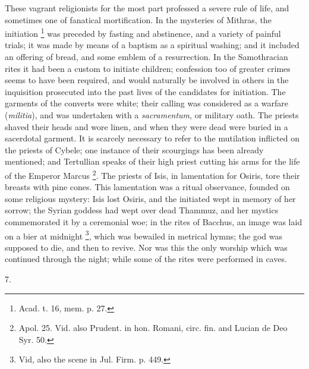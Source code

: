 These vagrant religionists for the most part professed
a severe rule of life, and sometimes one of fanatical
mortification. In the mysteries of Mithras, the
initiation \footnote{Acad. t. 16, mem. p. 27.}
was preceded by fasting and abstinence, and a variety of
painful trials; it was made by means of a baptism as a
spiritual washing; and it included an offering of bread,
and some emblem of a resurrection. In the Samothracian
rites it had been a custom to initiate children;
confession too of greater crimes seems to have been
required, and would naturally be involved in others in
the inquisition prosecuted into the past lives of the
candidates for initiation. The garments of the converts
were white; their calling was considered as a warfare (\emph{militia}),
and was undertaken with a \emph{sacramentum}, or military
oath. The priests shaved their heads and wore linen, and
when they were dead were buried in a sacerdotal garment.
It is scarcely necessary to refer to the mutilation
inflicted on the priests of Cybele; one instance of their
scourgings has been already mentioned; and Tertullian
speaks of their high priest cutting his arms for the life
of the Emperor Marcus \footnote{Apol. 25. Vid. also Prudent. in
hon. Romani, circ. fin. and Lucian de Deo Syr. 50.}. The priests of Isis, in
lamentation for Osiris, tore their breasts with pine
cones. This lamentation was a ritual observance, founded
on some religious mystery: Isis lost Osiris, and the
initiated wept in memory of her sorrow; the Syrian
goddess had wept over dead Thammuz, and her mystics
commemorated it by a ceremonial woe; in the rites of
Bacchus, an image was laid on a bier at midnight \footnote{Vid, also the scene in Jul.
Firm. p. 449.}, which
was bewailed in metrical hymns; the god was supposed to
die, and then to revive. Nor was this the only worship
which was continued through the night; while some of the
rites were performed in caves.

7.

